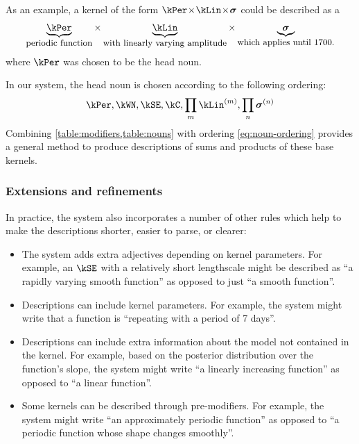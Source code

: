 As an example, a kernel of the form $\kPer \kerntimes  \kLin \kerntimes \boldsymbol{\sigma}$ could be described as a
\begin{align*}
\underbrace{\kPer}_{\textnormal{\small periodic function}} \times 
\underbrace{\kLin}_{\textnormal{\small with linearly varying amplitude}} \times 
\underbrace{\boldsymbol{\sigma}}_{\textnormal{\small which applies until 1700.}}
\end{align*}
where $\kPer$ was chosen to be the head noun.

In our system, the head noun is chosen according to the following ordering:
\begin{align}
\kPer, \kWN, \kSE, \kC, \prod_m \kLin^{(m)}, \prod_n \boldsymbol\sigma^{(n)}
\label{eq:noun-ordering}
\end{align}
Combining \cref{table:modifiers,table:nouns} with ordering \ref{eq:noun-ordering} provides a general method to produce descriptions of sums and products of these base kernels.


\subsubsection{Extensions and refinements}
In practice, the system also incorporates a number of other rules which help to make the descriptions shorter, easier to parse, or clearer:
\begin{itemize}
  \item The system adds extra adjectives depending on kernel parameters.
        For example, an $\kSE$ with a relatively short lengthscale might be described as ``a rapidly varying smooth function'' as opposed to just ``a smooth function''.
  \item Descriptions can include kernel parameters.
        For example, the system might write that a function is ``repeating with a period of 7 days''.
  \item Descriptions can include extra information about the model not contained in the kernel.
        For example, based on the posterior distribution over the function's slope, the system might write ``a linearly increasing function'' as opposed to ``a linear function''.
  \item Some kernels can be described through pre-modifiers.
        For example, the system might write ``an approximately periodic function'' as opposed to ``a periodic function whose shape changes smoothly''.
\end{itemize}


